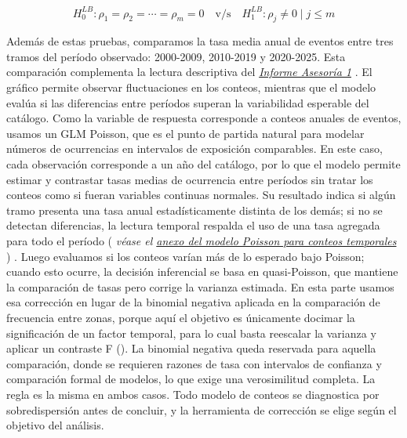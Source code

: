 \documentclass[
  spanish,
  letterpaper,
  DIV=11,
  numbers=noendperiod]{scrartcl}
\newcommand{\asesoriaParenRef}[1]{%
  \textnormal{\textcolor{asesoriaTextColor}{(}}%
  {\hypersetup{linkcolor=asesoriaLinkColor,urlcolor=asesoriaLinkColor,citecolor=asesoriaLinkColor}\textcolor{asesoriaTextColor}{\emph{#1}}}%
  \textnormal{\textcolor{asesoriaTextColor}{)}}%
}
\newcommand{\asesoriaExternalLink}[2]{%
  {\hypersetup{urlcolor=asesoriaLinkColor}\href{#1}{\textcolor{asesoriaLinkColor}{\emph{#2}}}}%
}
\begin{document}
\begingroup
\setlength{\abovedisplayskip}{0pt}
\setlength{\belowdisplayskip}{0pt}
\setlength{\abovedisplayshortskip}{0pt}
\setlength{\belowdisplayshortskip}{0pt}
\vspace{-1.10em}
\[
H_0^{LB}: \rho_1=\rho_2=\cdots=\rho_m=0
\quad \text{v/s} \quad
H_1^{LB}: \rho_j\neq 0 \mid j \leq m
\]
\vspace{-1.15em}
\endgroup

Además de estas pruebas, comparamos la tasa media anual de eventos entre
tres tramos del período observado: 2000-2009, 2010-2019 y 2020-2025.
Esta comparación complementa la lectura descriptiva del
\asesoriaExternalLink{https://mariajosevn.github.io/USGS-earthquake-analysis/Informes\%20Quarto/Informe\%20Asesor\%C3\%ADa\%201/Informe\%20Asesor\%C3\%ADa\%201\%20-\%20Actual.pdf}{Informe Asesoría 1}.
El gráfico permite observar fluctuaciones en los conteos, mientras que
el modelo evalúa si las diferencias entre períodos superan la
variabilidad esperable del catálogo. Como la variable de respuesta
corresponde a conteos anuales de eventos, usamos un GLM Poisson, que es
el punto de partida natural para modelar números de ocurrencias en
intervalos de exposición comparables. En este caso, cada observación
corresponde a un año del catálogo, por lo que el modelo permite estimar
y contrastar tasas medias de ocurrencia entre períodos sin tratar los
conteos como si fueran variables continuas normales. Su resultado indica
si algún tramo presenta una tasa anual estadísticamente distinta de los
demás; si no se detectan diferencias, la lectura temporal respalda el
uso de una tasa agregada para todo el período
\asesoriaParenRef{véase el \hyperref[sec-anexo-poisson-temporal]{anexo del modelo Poisson para conteos temporales}}.
Luego evaluamos si los conteos varían más de lo esperado bajo Poisson;
cuando esto ocurre, la decisión inferencial se basa en quasi-Poisson,
que mantiene la comparación de tasas pero corrige la varianza estimada.
En esta parte usamos esa corrección en lugar de la binomial negativa
aplicada en la comparación de frecuencia entre zonas, porque aquí el
objetivo es únicamente docimar la significación de un factor temporal,
para lo cual basta reescalar la varianza y aplicar un contraste F
(). La
binomial negativa queda reservada para aquella comparación, donde se
requieren razones de tasa con intervalos de confianza y comparación
formal de modelos, lo que exige una verosimilitud completa. La regla es
la misma en ambos casos. Todo modelo de conteos se diagnostica por
sobredispersión antes de concluir, y la herramienta de corrección se
elige según el objetivo del análisis.
\end{document}
